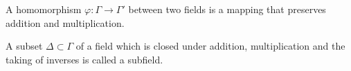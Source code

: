 A homomorphism $\varphi: \Gamma \rightarrow \Gamma'$ between two fields is a mapping that preserves addition and multiplication.

A subset $\Delta \subset \Gamma$ of a field which is closed under addition, multiplication and the taking of inverses is called a subfield.
